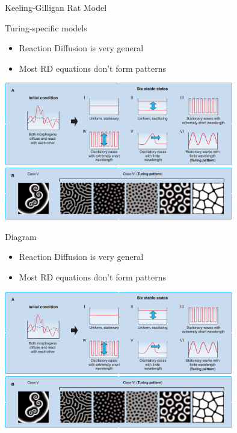 \documentclass[t,10pt,fleqn]{beamer}
\begin{document}
\begin{frame}{Keeling-Gilligan Rat Model}
  \vspace{-.3cm}
  \begin{block}{Turing-specific models}
    \begin{itemize}
      \item Reaction Diffusion is very general
      \pause
      \item Most RD equations don't form patterns
      \pause
    \end{itemize}
      \includegraphics[width=0.75\textwidth]{stable_states.png}\\
      \pause
      \includegraphics[width=0.75\textwidth]{turing_pattern.png}
  \end{block}
  \pause
  \begin{block}{Diagram}
    \begin{itemize}
      \item Reaction Diffusion is very general
      \pause
      \item Most RD equations don't form patterns
      \pause
    \end{itemize}
      \includegraphics[width=0.75\textwidth]{stable_states.png}\\
      \pause
      \includegraphics[width=0.75\textwidth]{turing_pattern.png}
  \end{block}
  \pause
\end{frame}
\end{document}
